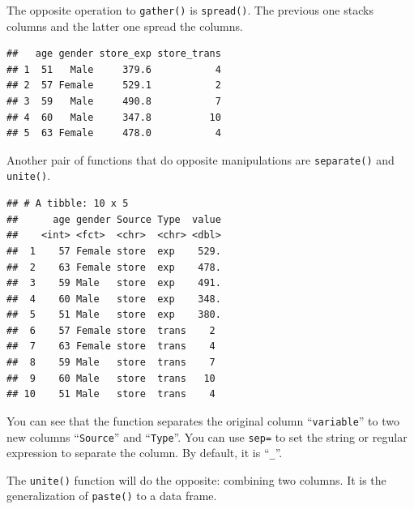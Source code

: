 \documentclass[12pt,]{krantz}
\makeatletter
\newenvironment{Shaded}{\begin{snugshade}}{\end{snugshade}}
\newcommand{\KeywordTok}[1]{\textcolor[rgb]{0.27,0.27,0.27}{\textbf{#1}}}
\newcommand{\NormalTok}[1]{#1}
\newcommand{\OperatorTok}[1]{\textcolor[rgb]{0.43,0.43,0.43}{\textbf{#1}}}
\newcommand{\StringTok}[1]{\textcolor[rgb]{0.5,0.5,0.5}{#1}}
\newenvironment{kframe}{%
\medskip{}
\setlength{\fboxsep}{.8em}
 \def\at@end@of@kframe{}%
 \ifinner\ifhmode%
  \def\at@end@of@kframe{\end{minipage}}%
  \begin{minipage}{\columnwidth}%
 \fi\fi%
 \def\FrameCommand##1{\hskip\@totalleftmargin \hskip-\fboxsep
 \colorbox{shadecolor}{##1}\hskip-\fboxsep
     \hskip-\linewidth \hskip-\@totalleftmargin \hskip\columnwidth}%
 \MakeFramed {\advance\hsize-\width
   \@totalleftmargin\z@ \linewidth\hsize
   \@setminipage}}%
 {\par\unskip\endMakeFramed%
 \at@end@of@kframe}
\renewenvironment{Shaded}{\begin{kframe}}{\end{kframe}}
\makeatother
\begin{document}
The opposite operation to \texttt{gather()} is \texttt{spread()}. The previous one stacks columns and the latter one spread the columns.

\begin{Shaded}
\end{Shaded}

\begin{verbatim}
##   age gender store_exp store_trans
## 1  51   Male     379.6           4
## 2  57 Female     529.1           2
## 3  59   Male     490.8           7
## 4  60   Male     347.8          10
## 5  63 Female     478.0           4
\end{verbatim}

Another pair of functions that do opposite manipulations are \texttt{separate()} and \texttt{unite()}.

\begin{Shaded}
\end{Shaded}

\begin{verbatim}
## # A tibble: 10 x 5
##      age gender Source Type  value
##    <int> <fct>  <chr>  <chr> <dbl>
##  1    57 Female store  exp    529.
##  2    63 Female store  exp    478.
##  3    59 Male   store  exp    491.
##  4    60 Male   store  exp    348.
##  5    51 Male   store  exp    380.
##  6    57 Female store  trans    2 
##  7    63 Female store  trans    4 
##  8    59 Male   store  trans    7 
##  9    60 Male   store  trans   10 
## 10    51 Male   store  trans    4
\end{verbatim}

You can see that the function separates the original column ``\texttt{variable}'' to two new columns ``\texttt{Source}'' and ``\texttt{Type}''. You can use \texttt{sep=} to set the string or regular expression to separate the column. By default, it is ``\texttt{\_}''.

The \texttt{unite()} function will do the opposite: combining two columns. It is the generalization of \texttt{paste()} to a data frame.
\end{document}

